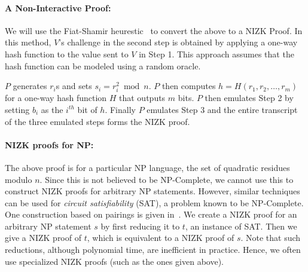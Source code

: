 \documentclass[]{report}   %
\begin{document}
\paragraph{A Non-Interactive Proof:} We will use the Fiat-Shamir heurestic~\cite{fiat1986prove} to convert the above to a NIZK Proof. In this method, $V$'s challenge in the second step is obtained by applying a  one-way hash function to the value sent to $V$ in Step 1. This approach assumes that the hash function can be modeled using a random oracle.

$P$ generates $r_i$s and sets $s_i = r_i^2\bmod{n}$. $P$ then computes $h = H(r_1, r_2, \ldots, r_m)$ for a one-way hash function $H$ that outputs $m$ bits. $P$ then emulates Step 2 by setting $b_i$ as the $i^{th}$ bit of $h$. Finally $P$ emulates Step 3 and the entire transcript of the three emulated steps forms the NIZK proof.

\paragraph{NIZK proofs for NP:} The above proof is for a particular NP language, the set of quadratic residues modulo $n$. Since this is not believed to be NP-Complete, we cannot use this to construct NIZK proofs for arbitrary NP statements. However, similar techniques can be used for {\em circuit satisfiability} (SAT), a problem known to be NP-Complete. One construction based on pairings is given in~\cite{groth2006perfect}. We create a NIZK proof for an arbitrary NP statement $s$ by first reducing it to $t$, an instance of SAT. Then we give a NIZK proof of $t$, which is equivalent to a NIZK proof of $s$. Note that such reductions, although polynomial time, are inefficient in practice. Hence, we often use specialized NIZK proofs (such as the ones given above).
\end{document}
